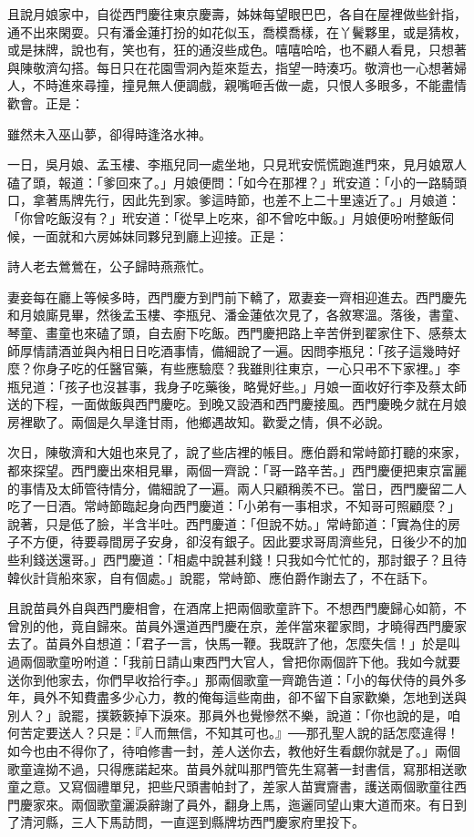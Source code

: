 且說月娘家中，自從西門慶往東京慶壽，姊妹每望眼巴巴，各自在屋裡做些針指，通不出來閑耍。只有潘金蓮打扮的如花似玉，喬模喬樣，在丫鬢夥里，或是猜枚，或是抹牌，說也有，笑也有，狂的通沒些成色。嘻嘻哈哈，也不顧人看見，只想著與陳敬濟勾搭。每日只在花園雪洞內踅來踅去，指望一時湊巧。敬濟也一心想著婦人，不時進來尋撞，撞見無人便調戲，親嘴咂舌做一處，只恨人多眼多，不能盡情歡會。正是：

雖然未入巫山夢，卻得時逢洛水神。

一日，吳月娘、孟玉樓、李瓶兒同一處坐地，只見玳安慌慌跑進門來，見月娘眾人磕了頭，報道：「爹回來了。」月娘便問：「如今在那裡？」玳安道：「小的一路騎頭口，拿著馬牌先行，因此先到家。爹這時節，也差不上二十里遠近了。」月娘道：「你曾吃飯沒有？」玳安道：「從早上吃來，卻不曾吃中飯。」月娘便吩咐整飯伺候，一面就和六房姊妹同夥兒到廳上迎接。正是：

詩人老去鶯鶯在，公子歸時燕燕忙。

妻妾每在廳上等候多時，西門慶方到門前下轎了，眾妻妾一齊相迎進去。西門慶先和月娘廝見畢，然後孟玉樓、李瓶兒、潘金蓮依次見了，各敘寒溫。落後，書童、琴童、畫童也來磕了頭，自去廚下吃飯。西門慶把路上辛苦併到翟家住下、感蔡太師厚情請酒並與內相日日吃酒事情，備細說了一遍。因問李瓶兒：「孩子這幾時好麼？你身子吃的任醫官藥，有些應驗麼？我雖則往東京，一心只弔不下家裡。」李瓶兒道：「孩子也沒甚事，我身子吃藥後，略覺好些。」月娘一面收好行李及蔡太師送的下程，一面做飯與西門慶吃。到晚又設酒和西門慶接風。西門慶晚夕就在月娘房裡歇了。兩個是久旱逢甘雨，他鄉遇故知。歡愛之情，俱不必說。

次日，陳敬濟和大姐也來見了，說了些店裡的帳目。應伯爵和常峙節打聽的來家，都來探望。西門慶出來相見畢，兩個一齊說：「哥一路辛苦。」西門慶便把東京富麗的事情及太師管待情分，備細說了一遍。兩人只顧稱羨不已。當日，西門慶留二人吃了一日酒。常峙節臨起身向西門慶道：「小弟有一事相求，不知哥可照顧麼？」說著，只是低了臉，半含半吐。西門慶道：「但說不妨。」常峙節道：「實為住的房子不方便，待要尋間房子安身，卻沒有銀子。因此要求哥周濟些兒，日後少不的加些利錢送還哥。」西門慶道：「相處中說甚利錢！只我如今忙忙的，那討銀子？且待韓伙計貨船來家，自有個處。」說罷，常峙節、應伯爵作謝去了，不在話下。

且說苗員外自與西門慶相會，在酒席上把兩個歌童許下。不想西門慶歸心如箭，不曾別的他，竟自歸來。苗員外還道西門慶在京，差伴當來翟家問，才曉得西門慶家去了。苗員外自想道：「君子一言，快馬一鞭。我既許了他，怎麼失信！」於是叫過兩個歌童吩咐道：「我前日請山東西門大官人，曾把你兩個許下他。我如今就要送你到他家去，你們早收拾行李。」那兩個歌童一齊跪告道：「小的每伏侍的員外多年，員外不知費盡多少心力，教的俺每這些南曲，卻不留下自家歡樂，怎地到送與別人？」說罷，撲簌簌掉下淚來。那員外也覺慘然不樂，說道：「你也說的是，咱何苦定要送人？只是：『人而無信，不知其可也。』──那孔聖人說的話怎麼違得！如今也由不得你了，待咱修書一封，差人送你去，教他好生看覷你就是了。」兩個歌童違拗不過，只得應諾起來。苗員外就叫那門管先生寫著一封書信，寫那相送歌童之意。又寫個禮單兒，把些尺頭書帕封了，差家人苗實齎書，護送兩個歌童往西門慶家來。兩個歌童灑淚辭謝了員外，翻身上馬，迤邐同望山東大道而來。有日到了清河縣，三人下馬訪問，一直逕到縣牌坊西門慶家府里投下。

